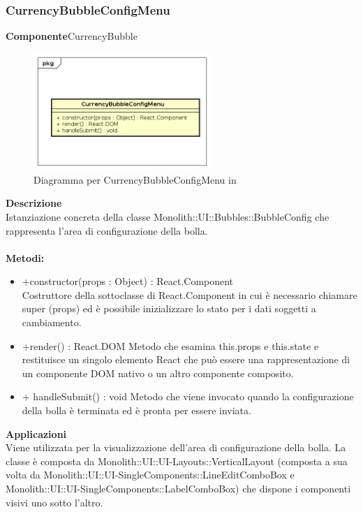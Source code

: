 \subsubsection{CurrencyBubbleConfigMenu}
\textbf{Componente}CurrencyBubble\\
   \FloatBarrier
   \begin{figure}[ht]
   \centering
   \includegraphics[width=0.6\textwidth]{img/single-CurrencyBubbleConfigMenu}
   \caption{{Diagramma per CurrencyBubbleConfigMenu in }}
\end{figure}
\FloatBarrier
\textbf{Descrizione}\\
Istanziazione concreta della classe Monolith::UI::Bubbles::BubbleConfig che rappresenta l'area di configurazione della bolla. 
\\
\\
\textbf{Metodi:} 
\begin{itemize}
\item +constructor(props : Object) : React.Component 
\\
Costruttore della sottoclasse di React.Component in cui è necessario chiamare super (props) ed è possibile inizializzare lo stato per i dati soggetti a cambiamento.

\item +render() : React.DOM
Metodo che esamina this.props e this.state e restituisce un singolo elemento React che può essere una rappresentazione di un componente DOM nativo o un altro componente composito.

\item + handleSubmit() : void
Metodo che viene invocato quando la configurazione della bolla è terminata ed è pronta per essere inviata.

\end{itemize} 


\textbf{Applicazioni}\\
Viene utilizzata per la visualizzazione dell'area di configurazione della bolla. 
La classe è composta da Monolith::UI::UI-Layouts::VerticalLayout (composta a sua volta da Monolith::UI::UI-SingleComponents::LineEditComboBox e Monolith::UI::UI-SingleComponents::LabelComboBox) che dispone i componenti visivi uno sotto l'altro. 


